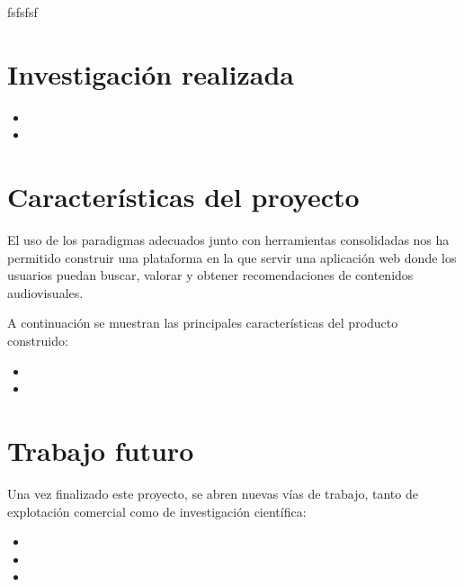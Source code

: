 
fsfsfsf
\section{Investigación realizada}

\begin{itemize}
\item 

\item 
\end{itemize}


\section{Características del proyecto}
El uso de los paradigmas adecuados junto con herramientas consolidadas nos ha permitido construir una plataforma en la que servir una aplicación web donde los usuarios puedan buscar, valorar y obtener recomendaciones de contenidos audiovisuales.

A continuación se muestran las principales características del producto construido:

\begin{itemize}
\item 
\item 
\end{itemize}


\section{Trabajo futuro}
Una vez finalizado este proyecto, se abren nuevas vías de trabajo, tanto de explotación comercial como de investigación científica:

\begin{itemize}
\item 
\item 
\item 
\end{itemize}
